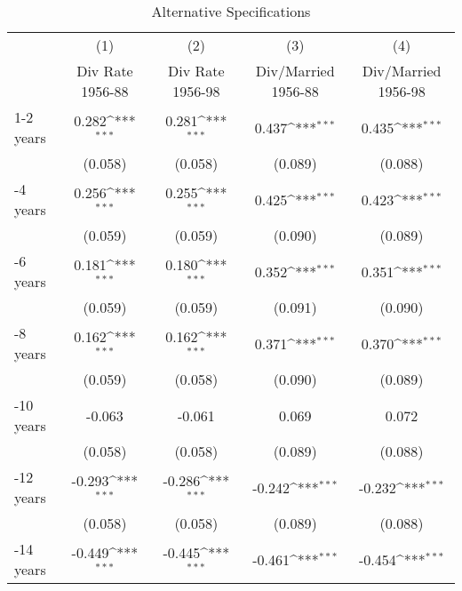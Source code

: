 \begin{table}[htbp]\centering
\def\sym#1{\ifmmode^{#1}\else\(^{#1}\)\fi}
\caption{Alternative Specifications}
\begin{tabular}{l*{4}{c}}
\toprule
                    &\multicolumn{1}{c}{(1)}&\multicolumn{1}{c}{(2)}&\multicolumn{1}{c}{(3)}&\multicolumn{1}{c}{(4)}\\
                    &\multicolumn{1}{c}{Div Rate 1956-88}&\multicolumn{1}{c}{Div Rate 1956-98}&\multicolumn{1}{c}{Div/Married 1956-88}&\multicolumn{1}{c}{Div/Married 1956-98}\\
\midrule
1-2 years           &       0.282\sym{***}&       0.281\sym{***}&       0.437\sym{***}&       0.435\sym{***}\\
                    &     (0.058)         &     (0.058)         &     (0.089)         &     (0.088)         \\
\addlinespace
3-4 years           &       0.256\sym{***}&       0.255\sym{***}&       0.425\sym{***}&       0.423\sym{***}\\
                    &     (0.059)         &     (0.059)         &     (0.090)         &     (0.089)         \\
\addlinespace
5-6 years           &       0.181\sym{***}&       0.180\sym{***}&       0.352\sym{***}&       0.351\sym{***}\\
                    &     (0.059)         &     (0.059)         &     (0.091)         &     (0.090)         \\
\addlinespace
7-8 years           &       0.162\sym{***}&       0.162\sym{***}&       0.371\sym{***}&       0.370\sym{***}\\
                    &     (0.059)         &     (0.058)         &     (0.090)         &     (0.089)         \\
\addlinespace
9-10 years          &      -0.063         &      -0.061         &       0.069         &       0.072         \\
                    &     (0.058)         &     (0.058)         &     (0.089)         &     (0.088)         \\
\addlinespace
11-12 years         &      -0.293\sym{***}&      -0.286\sym{***}&      -0.242\sym{***}&      -0.232\sym{***}\\
                    &     (0.058)         &     (0.058)         &     (0.089)         &     (0.088)         \\
\addlinespace
13-14 years         &      -0.449\sym{***}&      -0.445\sym{***}&      -0.461\sym{***}&      -0.454\sym{***}\\

\end{tabular}
\end{table}
